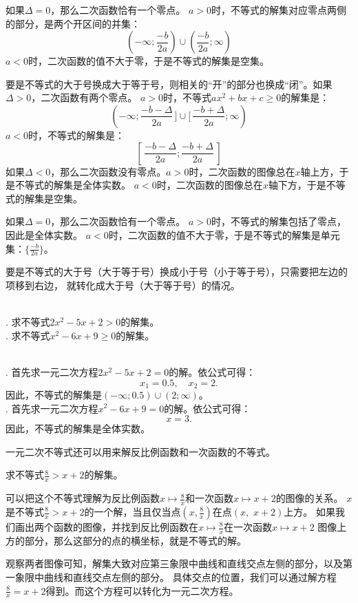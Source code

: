 \documentclass[12pt,UTF8,fontset=none]{ctexbook}
\begin{document}
如果$\Delta = 0$，那么二次函数恰有一个零点。
$a>0$时，不等式的解集对应零点两侧的部分，是两个开区间的并集：
$$ (-\infty; \frac{-b}{2a}) \cup (\frac{-b}{2a}; \infty)$$
$a<0$时，二次函数的值不大于零，于是不等式的解集是空集。

要是不等式的大于号换成大于等于号，则相关的“开”的部分也换成“闭”。如果$\Delta>0$，二次函数有两个零点。
$a>0$时，不等式$ax^2 + bx + c \geqslant 0$的解集是：
$$ (-\infty; \frac{-b - \Delta}{2a}\,] \cup [\,\frac{-b +\Delta}{2a}; \infty)$$
$a<0$时，不等式的解集是：
$$ [\,\frac{-b - \Delta}{2a}; \frac{-b +\Delta}{2a}\,] $$
如果$\Delta<0$，那么二次函数没有零点。$a>0$时，二次函数的图像总在$x$轴上方，于是不等式的解集是全体实数。
$a<0$时，二次函数的图像总在$x$轴下方，于是不等式的解集是空集。

如果$\Delta = 0$，那么二次函数恰有一个零点。
$a>0$时，不等式的解集包括了零点，因此是全体实数。
$a<0$时，二次函数的值不大于零，于是不等式的解集是单元集：$\{\frac{-b}{2a}\}$。

要是不等式的大于号（大于等于号）换成小于号（小于等于号），只需要把左边的项移到右边，
就转化成大于号（大于等于号）的情况。

\begin{ex}
    \mbox{}\\
    . 求不等式$2x^2 - 5x + 2 > 0$的解集。\\
    . 求不等式$x^2 - 6x + 9 \geqslant 0$的解集。
\end{ex}
\begin{so}
    \mbox{}\\
    . 首先求一元二次方程$2x^2 - 5x + 2 = 0$的解。依公式可得：
    $$ x_1 = 0.5, \quad x_2 = 2.$$
    因此，不等式的解集是$(-\infty; 0.5) \cup (2; \infty)$。\\
    . 首先求一元二次方程$x^2 - 6x + 9 = 0$的解。依公式可得：
    $$ x = 3.$$
    因此，不等式的解集是全体实数。
\end{so}

一元二次不等式还可以用来解反比例函数和一次函数的不等式。
\begin{ex}
    求不等式$\frac{8}{x} > x + 2$的解集。
\end{ex}
可以把这个不等式理解为反比例函数$x \mapsto \frac{8}{x}$和一次函数$x \mapsto x + 2$的图像的关系。
$x$是不等式$\frac{8}{x} > x + 2$的一个解，当且仅当点$(x, \frac{8}{x})$在点$(x, \,\,x + 2)$上方。
如果我们画出两个函数的图像，并找到反比例函数在$x \mapsto \frac{8}{x}$在一次函数$x \mapsto x + 2$
图像上方的部分，那么这部分的点的横坐标，就是不等式的解。

观察两者图像可知，解集大致对应第三象限中曲线和直线交点左侧的部分，以及第一象限中曲线和直线交点左侧的部分。
具体交点的位置，我们可以通过解方程$\frac{8}{x} = x + 2$得到。而这个方程可以转化为一元二次方程。
\end{document}
